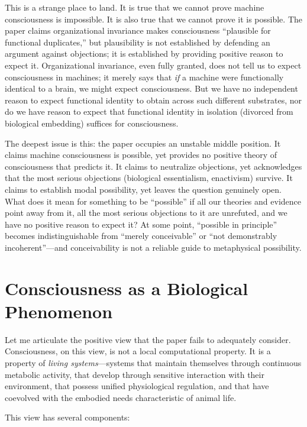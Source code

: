 \documentclass[11pt]{article}
\begin{document}
This is a strange place to land. It is true that we cannot prove machine consciousness is impossible. It is also true that we cannot prove it is possible. The paper claims organizational invariance makes consciousness ``plausible for functional duplicates,'' but plausibility is not established by defending an argument against objections; it is established by providing positive reason to expect it. Organizational invariance, even fully granted, does not tell us to expect consciousness in machines; it merely says that \textit{if} a machine were functionally identical to a brain, we might expect consciousness. But we have no independent reason to expect functional identity to obtain across such different substrates, nor do we have reason to expect that functional identity in isolation (divorced from biological embedding) suffices for consciousness.

The deepest issue is this: the paper occupies an unstable middle position. It claims machine consciousness is possible, yet provides no positive theory of consciousness that predicts it. It claims to neutralize objections, yet acknowledges that the most serious objections (biological essentialism, enactivism) survive. It claims to establish modal possibility, yet leaves the question genuinely open. What does it mean for something to be ``possible'' if all our theories and evidence point away from it, all the most serious objections to it are unrefuted, and we have no positive reason to expect it? At some point, ``possible in principle'' becomes indistinguishable from ``merely conceivable'' or ``not demonstrably incoherent''---and conceivability is not a reliable guide to metaphysical possibility.

\section{Consciousness as a Biological Phenomenon}

Let me articulate the positive view that the paper fails to adequately consider. Consciousness, on this view, is not a local computational property. It is a property of \textit{living systems}---systems that maintain themselves through continuous metabolic activity, that develop through sensitive interaction with their environment, that possess unified physiological regulation, and that have coevolved with the embodied needs characteristic of animal life.

This view has several components:
\end{document}
